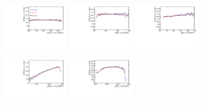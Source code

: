 \begin{figure}[h]
\centering
\includegraphics[height=!,width=0.3\textwidth]{figs/AcceptancePhsp/eff_Kpipi_Ds.pdf}
\includegraphics[height=!,width=0.3\textwidth]{figs/AcceptancePhsp/eff_Kpi_Ds.pdf}
\includegraphics[height=!,width=0.3\textwidth]{figs/AcceptancePhsp/eff_pipi_Ds.pdf}

\includegraphics[height=!,width=0.3\textwidth]{figs/AcceptancePhsp/eff_Dspipi_Ds.pdf}
\includegraphics[height=!,width=0.3\textwidth]{figs/AcceptancePhsp/eff_Dspi_Ds.pdf}


\end{figure}
